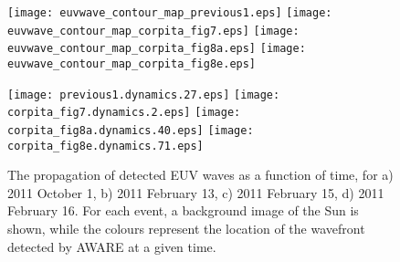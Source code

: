 \begin{figure}
\begin{center}
\texttt{[image: euvwave\_contour\_map\_previous1.eps]}
\texttt{[image: euvwave\_contour\_map\_corpita\_fig7.eps]}
\texttt{[image: euvwave\_contour\_map\_corpita\_fig8a.eps]}
\texttt{[image: euvwave\_contour\_map\_corpita\_fig8e.eps]}

\texttt{[image: previous1.dynamics.27.eps]}
\texttt{[image: corpita\_fig7.dynamics.2.eps]}
\texttt{[image: corpita\_fig8a.dynamics.40.eps]}
\texttt{[image: corpita\_fig8e.dynamics.71.eps]}
\caption{The propagation of detected EUV waves as a function of time, for a) 2011 October 1, b) 2011 February 13, c) 2011 February 15, d) 2011 February 16. For each event, a background image of the Sun is shown, while the colours represent the location of the wavefront detected by AWARE at a given time.}
\end{center}
\end{figure}




